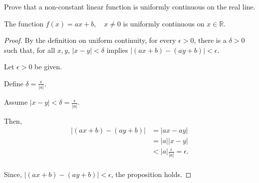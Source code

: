 \documentclass[../hw5.tex]{subfiles}
\begin{document}
Prove that a non-constant linear function is uniformly continuous on the real line.

\begin{proposition}
    The function $f(x)=ax+b, \quad x\neq0$ is uniformly continuous on $x \in \mathbb{R}$. 
\end{proposition}

\begin{proof}
    By the definition on uniform continuity, for every $\epsilon>0$, there is a $\delta>0$ such that, for all $x,y$, $|x-y|<\delta$ implies $\Big|(ax+b)-(ay+b)\Big|<\epsilon$.

    Let $\epsilon>0$ be given.
    
    Define $\delta=\frac{\epsilon}{|a|}$. 
    
    Assume $|x-y|<\delta=\frac{\epsilon}{|a|}$.

    Then,
    \begin{align*}
        \Big|(ax+b)-(ay+b)\Big| &= |ax-ay| \\
        &= |a||x-y| \\
        &< |a|\frac{\epsilon}{|a|} = \epsilon. \\
    \end{align*}

    Since, $\Big|(ax+b)-(ay+b)\Big|<\epsilon$, the proposition holds.
\end{proof}
\end{document}
